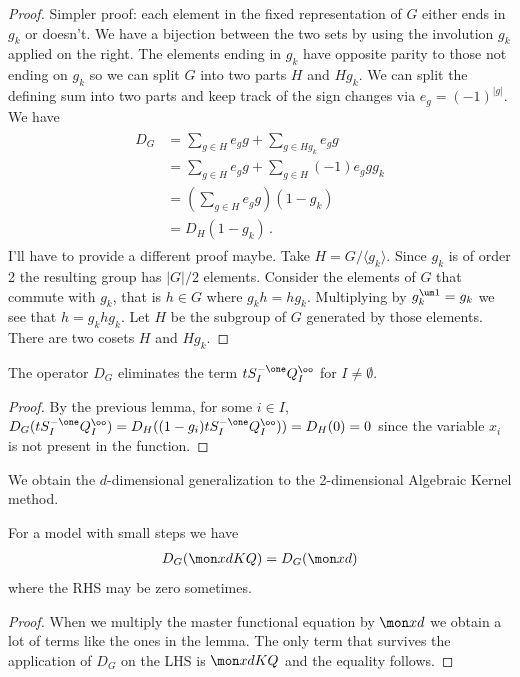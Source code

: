 \begin{proof} Simpler proof: each element in the fixed representation of $G$ either ends in $g_k$ or doesn't. We have a bijection between the two sets by using the involution $g_k$ applied on the right. The elements ending in $g_k$ have opposite parity to those not ending on $g_k$ so we can split $G$ into two parts $H$ and $Hg_k$. We can split the defining sum into two parts and keep track of the sign changes via $e_g = (-1)^{|g|}$. We have
\begin{align}\begin{split}
	D_G &=\sum_{g \in H} e_g g + \sum_{g \in Hg_k} e_g g\\
	&=\sum_{g \in H} e_g g + \sum_{g \in H} (-1)e_g g g_k\\
	&= \left(\sum_{g \in H} e_g g\right)(1-g_k)\\
	&= D_H(1-g_k)\,.
\end{split}\end{align}
I'll have to provide a different proof maybe. Take $H = G/\langle g_k \rangle$. Since $g_k$ is of order 2 the resulting group has $|G|/2$ elements. Consider the elements of $G$ that commute with $g_k$, that is $h\in G$ where $g_k h = h g_k$. Multiplying by $g_k^{\um 1} = g_k$ we see that $h = g_k h g_k$. Let $H$ be the subgroup of $G$ generated by those elements. There are two cosets $H$ and $Hg_k$.
\end{proof}
\begin{lemma} The operator $D_G$ eliminates the term $t S_I^{-\one}Q_I^\oo$ for $I \neq \emptyset$.
\end{lemma}
\begin{proof} By the previous lemma, for some $i\in I$, $D_G(t S_I^{-\one}Q_I^\oo) = D_H((1-g_i)t S_I^{-\one}Q_I^\oo)) = D_H(0) = 0$ since the variable $x_i$ is not present in the function.
\end{proof}
We obtain the $d$-dimensional generalization to the 2-dimensional Algebraic Kernel method.
\begin{theorem} For a model with small steps we have
\begin{align}
D_G(\mon xd KQ) = D_G(\mon xd)
\end{align}
where the RHS may be zero sometimes.
\end{theorem}
\begin{proof} When we multiply the master functional equation by $\mon xd$ we obtain a lot of terms like the ones in the lemma. The only term that survives the application of $D_G$ on the LHS is $\mon xd KQ$ and the equality follows.
\end{proof}

